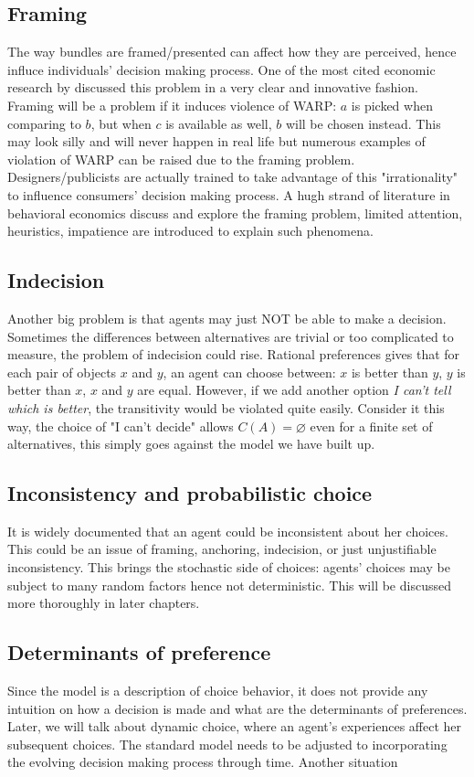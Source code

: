 \subsection{Framing}
The way bundles are framed/presented can affect how they are perceived, hence influce individuals' decision making process. One of the most cited economic research by \citet{kai1979prospect} discussed this problem in a very clear and
innovative fashion. Framing will be a problem if it induces violence of WARP: $a$ is picked when comparing to $b$, but when $c$ is available as well, $b$ will be chosen instead. This may look silly and will never happen in real life but 
numerous examples of violation of WARP can be raised due to the framing problem. Designers/publicists are actually trained to take advantage of this "irrationality" to influence consumers' decision making process. A hugh strand of literature
in behavioral economics discuss and explore the framing problem, limited attention, heuristics, impatience are introduced to explain such phenomena. 

\subsection{Indecision}
Another big problem is that agents may just NOT be able to make a decision. Sometimes the differences between alternatives are trivial or too complicated to measure, the problem of indecision could rise. Rational preferences gives that for each pair of objects $x$ and $y$, an agent can 
choose between: $x$ is better than $y$, $y$ is better than $x$, $x$ and $y$ are equal. However, if we add another option \textit{I can't tell which is better}, the transitivity would be violated quite easily. Consider it this way, the choice of "I can't decide" allows $C(A)=\varnothing$ even
for a finite set of alternatives, this simply goes against the model we have built up.

\subsection{Inconsistency and probabilistic choice}
It is widely documented that an agent could be inconsistent about her choices. This could be an issue of framing, anchoring, indecision, or just unjustifiable inconsistency. This brings the stochastic side of choices: agents' choices may be subject to many random factors
hence not deterministic. This will be discussed more thoroughly in later chapters.

\subsection{Determinants of preference}
Since the model is a description of choice behavior, it does not provide any intuition on how a decision is made and what are the determinants of preferences. Later, we will talk about dynamic choice, where an agent's experiences affect her subsequent choices.
The standard model needs to be adjusted to incorporating the evolving decision making process through time. Another situation
